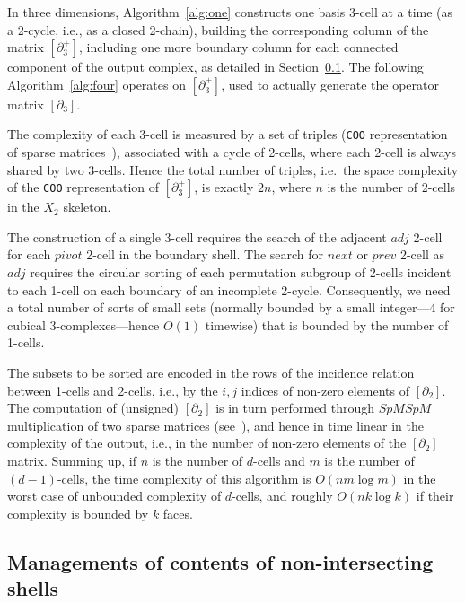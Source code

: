 In three dimensions, Algorithm~\ref{alg:one} constructs one basis 3-cell at a time (as a 2-cycle, i.e., as a closed 2-chain), building the corresponding column of the matrix $[\partial_3^+]$, including one more boundary column for each connected component of the output complex, as detailed in Section~\ref{sec:shells}. The following Algorithm~\ref{alg:four} operates on $[\partial_3^+]$, used to actually generate the operator matrix $[\partial_3]$.

The complexity of each 3-cell is measured by a set of triples (\texttt{COO} representation of sparse matrices~\cite{gemmexp}), associated with a cycle of 2-cells, where each 2-cell is always shared by two 3-cells. Hence the total number of triples, i.e.~the space complexity of the \texttt{COO} representation of $[\partial_3^+]$, is exactly $2n$, where $n$ is the number of 2-cells in the $X_2$ skeleton. 

The construction of a single 3-cell requires the search of the adjacent $\mathit{adj}$ 2-cell for each $\mathit{pivot}$ 2-cell in the boundary shell. The search for $\mathit{next}$ or $\mathit{prev}$ 2-cell as $\mathit{adj}$ requires the circular sorting of each permutation subgroup of 2-cells incident to each 1-cell on each boundary of an incomplete 2-cycle. Consequently, we need a total number of sorts of small sets (normally bounded by a small integer---4 for cubical 3-complexes---hence $O(1)$ timewise) that is bounded by the number of 1-cells. 

The subsets to be sorted are encoded in the rows of the incidence relation between 1-cells and 2-cells, i.e., by the $i,j$ indices of  non-zero elements of $[\partial_2]$. The computation of (unsigned) $[\partial_2]$ is in turn performed through $SpMSpM$ multiplication of two sparse matrices (see~\cite{Dicarlo:2014:TNL:2543138.2543294}), and hence in time linear in the complexity of the output, i.e., in the number of non-zero elements of the   $[\partial_2]$ matrix.  Summing up, if $n$  is the number of $d$-cells and $m$ is the number of $(d-1)$-cells, the time complexity of this algorithm is $O(n m\log m)$ in the worst case of unbounded complexity of $d$-cells, and roughly $O(n k\log k)$ if their complexity is bounded by $k$ faces.


\subsection{Managements of contents of non-intersecting shells}
\label{sec:shells}

